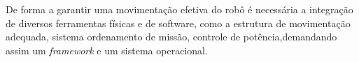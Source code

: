 %
%
%
%
%
%
%

De forma a garantir uma movimentação efetiva do robô é necessária a integração de diversos ferramentas físicas e de software, como a estrutura de movimentação adequada, sistema ordenamento de missão, controle de potência,demandando assim um \textit{framework} e um sistema operacional.


